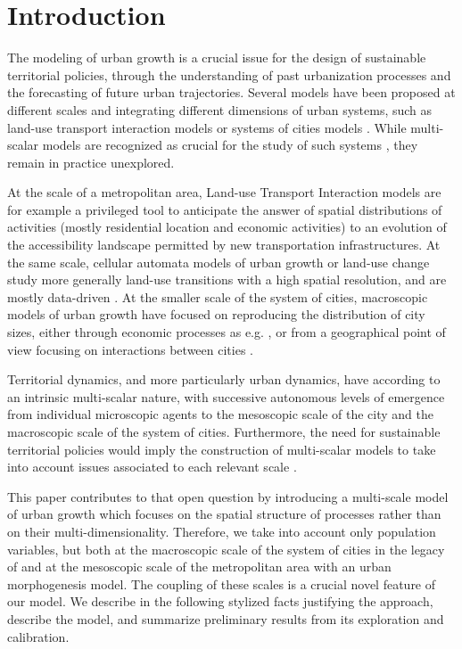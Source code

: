 \documentclass[11pt]{article}
\begin{document}




\section{Introduction}

The modeling of urban growth is a crucial issue for the design of sustainable territorial policies, through the understanding of past urbanization processes and the forecasting of future urban trajectories. Several models have been proposed at different scales and integrating different dimensions of urban systems, such as land-use transport interaction models \cite{wegener2004land} or systems of cities models \cite{pumain2017urban}. While multi-scalar models are recognized as crucial for the study of such systems \cite{Rozenblat2018}, they remain in practice unexplored.

At the scale of a metropolitan area, Land-use Transport Interaction models \cite{wegener2004land} are for example a privileged tool to anticipate the answer of spatial distributions of activities (mostly residential location and economic activities) to an evolution of the accessibility landscape permitted by new transportation infrastructures. At the same scale, cellular automata models of urban growth or land-use change study more generally land-use transitions with a high spatial resolution, and are mostly data-driven \cite{clarke2007decade}. At the smaller scale of the system of cities, macroscopic models of urban growth have focused on reproducing the distribution of city sizes, either through economic processes as e.g. \cite{gabaix1999zipf}, or from a geographical point of view focusing on interactions between cities \cite{favaro2011gibrat}.

Territorial dynamics, and more particularly urban dynamics, have according to \cite{pumain1997pour} an intrinsic multi-scalar nature, with successive autonomous levels of emergence from individual microscopic agents to the mesoscopic scale of the city and the macroscopic scale of the system of cities. Furthermore, the need for sustainable territorial policies would imply the construction of multi-scalar models to take into account issues associated to each relevant scale \cite{Rozenblat2018}.

This paper contributes to that open question by introducing a multi-scale model of urban growth which focuses on the spatial structure of processes rather than on their multi-dimensionality. Therefore, we take into account only population variables, but both at the macroscopic scale of the system of cities in the legacy of \cite{pumain2017urban} and at the mesoscopic scale of the metropolitan area with an urban morphogenesis model. The coupling of these scales is a crucial novel feature of our model. We describe in the following stylized facts justifying the approach, describe the model, and summarize preliminary results from its exploration and calibration.
\end{document}
